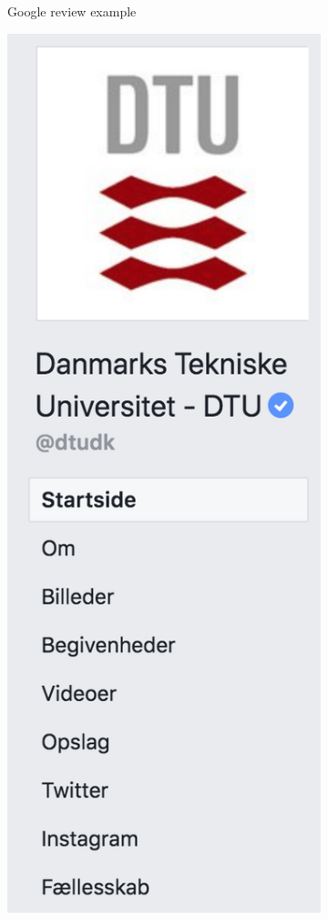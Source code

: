 \begin{figure}[H]
\begin{subfigure}{0.32\textwidth}
    \caption{Google review example}
    \end{subfigure}
    \begin{subfigure}{0.32\textwidth}
    \centering
    \includegraphics[width=0.8\linewidth]{images/FacebookGroup.png} 

\end{subfigure}
\end{figure}
